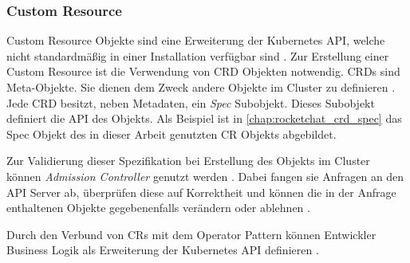 \subsubsection{Custom Resource}
\label{subsection:kubernetes:customresource}
Custom Resource Objekte sind eine Erweiterung der Kubernetes API,
welche nicht standardmäßig in einer Installation verfügbar sind \cite{kubernetesCustomResource}.
Zur Erstellung einer Custom Resource ist die Verwendung von \acf{CRD} Objekten notwendig. 
\acp{CRD} sind Meta-Objekte.
Sie dienen dem Zweck andere Objekte im Cluster zu definieren \cite{Burns2019}.
Jede \ac{CRD} besitzt, neben Metadaten, ein \emph{Spec} Subobjekt. Dieses Subobjekt definiert die API des Objekts.
Als Beispiel ist in \ref{chap:rocketchat_crd_spec} das Spec Objekt des in dieser Arbeit genutzten \ac{CR} Objekts abgebildet.


Zur Validierung dieser Spezifikation bei Erstellung des Objekts im Cluster können \emph{Admission Controller} genutzt werden \cite{Burns2019}.
Dabei fangen sie Anfragen an den API Server ab, überprüfen diese auf Korrektheit 
und können die in der Anfrage enthaltenen Objekte gegebenenfalls verändern oder ablehnen \cite{Burns2019}. 


Durch den Verbund von \acp{CR} mit dem Operator Pattern können Entwickler Business Logik als Erweiterung der Kubernetes API definieren \cite{kubernetesCustomResource}.
